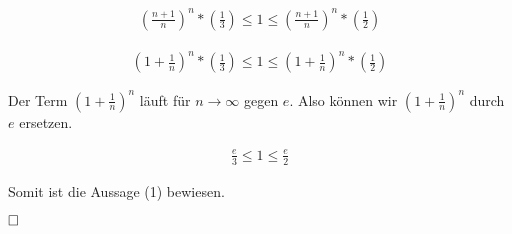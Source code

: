\documentclass[12pt]{scrartcl}%
\theoremstyle{nonumberplain}
\begin{document}
\begin{align*}
	(\frac{n+1}{n})^{n} * (\frac{1}{3}) \le 1 \le (\frac{n+1}{n})^{n} * (\frac{1}{2})
\end{align*}

\begin{align*}
	(1 + \frac{1}{n})^{n} * (\frac{1}{3}) \le 1 \le (1 + \frac{1}{n})^{n} * (\frac{1}{2})
\end{align*}

Der Term $(1 + \frac{1}{n})^{n}$ läuft für $n \rightarrow \infty$ gegen $e$. Also können wir $(1 + \frac{1}{n})^{n}$ durch $e$ ersetzen.

\begin{align*}
	\frac{e}{3} \le 1 \le \frac{e}{2}
\end{align*}

Somit ist die Aussage (1) bewiesen.

$\hfill \square$
\end{document}

